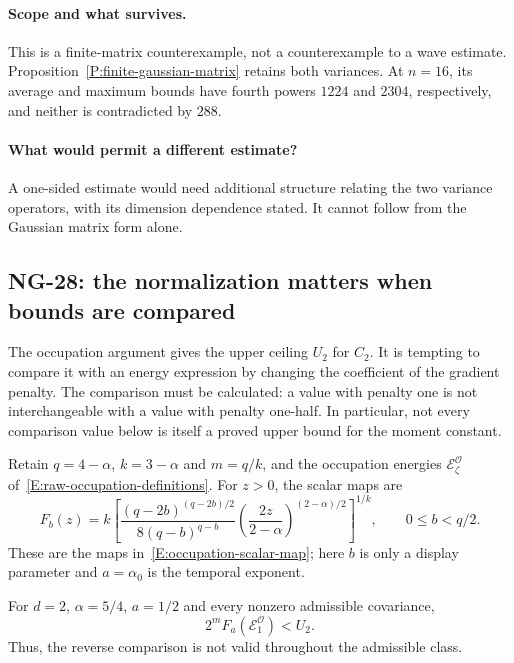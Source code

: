 \paragraph{Scope and what survives.}
This is a finite-matrix counterexample, not a counterexample to a wave
estimate. Proposition~\ref{P:finite-gaussian-matrix} retains both variances.
At $n=16$, its average and maximum bounds have fourth powers $1224$ and
$2304$, respectively, and neither is contradicted by $288$.

\paragraph{What would permit a different estimate?}
A one-sided estimate would need additional structure relating the two
variance operators, with its dimension dependence stated. It cannot follow
from the Gaussian matrix form alone.

\subsection{NG-28: the normalization matters when bounds are compared}
\label{S:nogo-28}

The occupation argument gives the upper ceiling $U_2$ for $C_2$.
It is tempting to compare it with an energy expression by changing the
coefficient of the gradient penalty. The comparison must be calculated:
a value with penalty one is not interchangeable with a value with penalty
one-half. In particular, not every comparison value below is itself a proved
upper bound for the moment constant.

Retain $q=4-\alpha$, $k=3-\alpha$ and $m=q/k$, and the occupation energies
$\mathcal{E}_\zeta^{\mathcal O}$ of~\eqref{E:raw-occupation-definitions}.
For $z>0$, the scalar maps are
\[
  F_b(z)=k\left[
  \frac{(q-2b)^{(q-2b)/2}}{8(q-b)^{q-b}}
  \left(\frac{2z}{2-\alpha}\right)^{(2-\alpha)/2}
  \right]^{1/k},\qquad 0\le b<q/2.
\]
These are the maps in~\eqref{E:occupation-scalar-map}; here $b$ is only
a display parameter and $a=\alpha_0$ is the temporal exponent.

\setcounter{nogo}{27}
\begin{nogo}
  \label{P:nogo-28}
  For $d=2$, $\alpha=5/4$, $a=1/2$ and every nonzero admissible covariance,
  \[
    2^mF_a(\mathcal{E}_1^{\mathcal O})<U_2.
  \]
  Thus, the reverse comparison is not valid throughout the admissible class.
\end{nogo}

